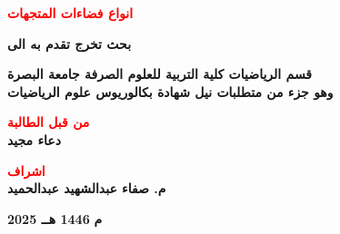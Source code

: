 \begin{titlepage}
	\vspace{1cm}
	
	\begin{center}
		\Large \textbf{\textcolor{red}{انواع فضاءات المتجهات}}\\
	\end{center}
	\vfill
	
	\begin{center}
		\large
		\textbf{بحث تخرج تقدم به الى}
	\end{center}
	
	\begin{center}
		\large
		\textbf{قسم الرياضيات كلية التربية للعلوم الصرفة جامعة البصرة\\
			\vspace{6pt}
			وهو جزء من متطلبات نيل شهادة بكالوريوس علوم الرياضيات}
	\end{center}
	\vfill
	\begin{center}
		\large
\textbf{\textcolor{red}{من قبل الطالبة}}\\
		\vspace{8pt}
		\large
		\textbf{دعاء مجيد}
	\end{center}
	\vspace{10pt}
	\begin{center}
		\large
\textbf{\textcolor{red}{اشراف}}\\
		\vspace{8pt}
		\large
		\textbf{م. صفاء عبدالشهيد عبدالحميد}
	\end{center}
	\vspace{80pt}
	\begingroup
	\large{\raggedleft \textbf{2025 م}} {\hfill \textbf{1446 هــ}}
	\endgroup
\end{titlepage}
\restoregeometry